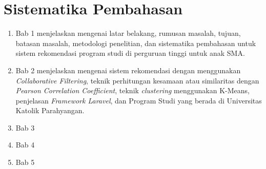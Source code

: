 
\section{Sistematika Pembahasan}
\label{sec:sispem}
\begin{enumerate}
	\item Bab 1 menjelaskan mengenai latar belakang, rumusan masalah, tujuan, batasan masalah, metodologi penelitian, dan sistematika pembahasan untuk sistem rekomendasi program studi di perguruan tinggi untuk anak SMA.
	\item Bab 2 menjelaskan mengenai sistem rekomendasi dengan menggunakan \textit{Collaborative Filtering}, teknik perhitungan kesamaan atau similaritas dengan \textit{Pearson Correlation Coefficient}, teknik \textit{clustering} menggunakan K-Means, penjelasan \textit{Framework Laravel}, dan Program Studi yang berada di Universitas Katolik Parahyangan. 
	\item Bab 3
	\item Bab 4
	\item Bab 5
\end{enumerate}
